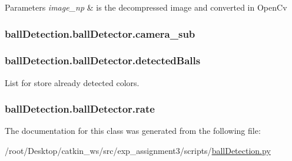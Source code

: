\begin{DoxyParams}{Parameters}
{\em image\+\_\+np} & is the decompressed image and converted in Open\+Cv \\
\hline
\end{DoxyParams}
\subsubsection[{\texorpdfstring{camera\+\_\+sub}{camera_sub}}]{\setlength{\rightskip}{0pt plus 5cm}ball\+Detection.\+ball\+Detector.\+camera\+\_\+sub}\hypertarget{classballDetection_1_1ballDetector_a80579e1cc221f9c74eafb6cf5a24e132}{}\label{classballDetection_1_1ballDetector_a80579e1cc221f9c74eafb6cf5a24e132}
\subsubsection[{\texorpdfstring{detected\+Balls}{detectedBalls}}]{\setlength{\rightskip}{0pt plus 5cm}ball\+Detection.\+ball\+Detector.\+detected\+Balls}\hypertarget{classballDetection_1_1ballDetector_ae7c6db80d37aa2d3f22b0ea9331823d2}{}\label{classballDetection_1_1ballDetector_ae7c6db80d37aa2d3f22b0ea9331823d2}


List for store already detected colors. 

\subsubsection[{\texorpdfstring{rate}{rate}}]{\setlength{\rightskip}{0pt plus 5cm}ball\+Detection.\+ball\+Detector.\+rate}\hypertarget{classballDetection_1_1ballDetector_a2078441c3a3cc044e914c90656a9a5e0}{}\label{classballDetection_1_1ballDetector_a2078441c3a3cc044e914c90656a9a5e0}


The documentation for this class was generated from the following file\+:\begin{DoxyCompactItemize}
\item 
/root/\+Desktop/catkin\+\_\+ws/src/exp\+\_\+assignment3/scripts/\hyperlink{ballDetection_8py}{ball\+Detection.\+py}\end{DoxyCompactItemize}
